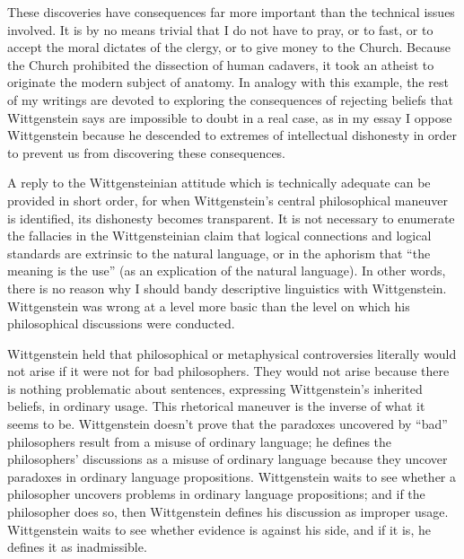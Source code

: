\begin{enumerate}[label=\textbf{\Alph*.}, wide, nosep, itemsep=1em]
These discoveries have consequences far more important than the technical issues involved. It is by no means trivial that I do not have to pray, or to fast, or to accept the moral dictates of the clergy, or to give money to the Church. Because the Church prohibited the dissection of human cadavers, it took an atheist to originate the modern subject of anatomy. In analogy with this example, the rest of my writings are devoted to exploring the consequences of rejecting beliefs that Wittgenstein says are impossible to doubt in a real case, as in my essay  I oppose Wittgenstein because he descended to extremes of intellectual dishonesty in order to prevent us from discovering these consequences. 

A reply to the Wittgensteinian attitude which is technically adequate can be provided in short order, for when Wittgenstein's central philosophical maneuver is identified, its dishonesty becomes transparent. It is not necessary to enumerate the fallacies in the Wittgensteinian claim that logical connections and logical standards are extrinsic to the natural language, or in the aphorism that \enquote{the meaning is the use} (as an explication of the natural language). In other words, there is no reason why I should bandy descriptive linguistics with Wittgenstein. Wittgenstein was wrong at a level more basic than the level on which his philosophical discussions were conducted. 

Wittgenstein held that philosophical or metaphysical controversies literally would not arise if it were not for bad philosophers. They would not arise because there is nothing problematic about sentences, expressing Wittgenstein's inherited beliefs, in ordinary usage. This rhetorical maneuver is the inverse of what it seems to be. Wittgenstein doesn't prove that the paradoxes uncovered by \enquote{bad} philosophers result from a misuse of ordinary language; he defines the philosophers' discussions as a misuse of ordinary language because they uncover paradoxes in ordinary language propositions. Wittgenstein waits to see whether a philosopher uncovers problems in ordinary language propositions; and if the philosopher does so, then Wittgenstein defines his discussion as improper usage. Wittgenstein waits to see whether evidence is against his side, and if it is, he defines it as inadmissible. 


\end{enumerate}
